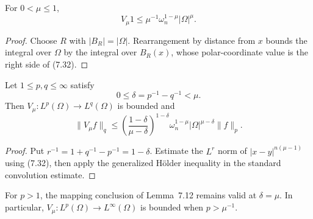 \begin{proposition}
\label{gt:prop-sobolev-riesz-potential-one}
For $0<\mu\leq1$,
\begin{equation}
\tag{7.32}
V_\mu1\leq \mu^{-1}\omega_n^{1-\mu}|\Omega|^\mu.
\end{equation}
\end{proposition}
\begin{proof}
\sketch Choose $R$ with $|B_R|=|\Omega|$. Rearrangement by distance from
$x$ bounds the integral over $\Omega$ by the integral over $B_R(x)$, whose
polar-coordinate value is the right side of (7.32).
\end{proof}

\begin{lemma}
\label{gt:lem-sobolev-riemann-potential-mapping}
Let $1\leq p,q\leq\infty$ satisfy
\begin{equation}
\tag{7.33}
0\leq\delta=p^{-1}-q^{-1}<\mu.
\end{equation}
Then $V_\mu:L^p(\Omega)\to L^q(\Omega)$ is bounded and
\begin{equation}
\tag{7.34}
\|V_\mu f\|_q
\leq\left(\frac{1-\delta}{\mu-\delta}\right)^{1-\delta}
\omega_n^{1-\mu}|\Omega|^{\mu-\delta}\|f\|_p.
\end{equation}
\end{lemma}
\begin{proof}
\sketch Put $r^{-1}=1+q^{-1}-p^{-1}=1-\delta$. Estimate the
$L^r$ norm of $|x-y|^{n(\mu-1)}$ using (7.32), then apply the generalized
H\"older inequality in the standard convolution estimate.
\end{proof}

\begin{remark}
\label{gt:rem-sobolev-riesz-endpoint}
For $p>1$, the mapping conclusion of Lemma~7.12 remains valid at
$\delta=\mu$. In particular, $V_\mu:L^p(\Omega)\to L^\infty(\Omega)$ is
bounded when $p>\mu^{-1}$.
\end{remark}

